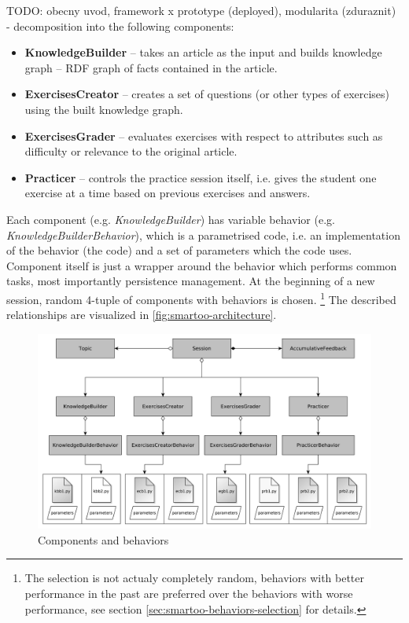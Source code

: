 \documentclass[a4paper, 12pt, twoside]{fithesis2}		%
\renewcommand{\_}{\leavevmode \kern0.07em\vbox{\hrule width0.4em}}
\newcommand{\squarebullet}{\textcolor{black}{\raisebox{0.15em}{\rule{4pt}{4pt}}}}
\newenvironment{myItemize}{
  \begin{itemize}[leftmargin=2em,rightmargin=1em,itemsep=\parskip ,parsep=0em,topsep=0em,partopsep=0em]
  \renewcommand{\labelitemi}{\squarebullet}
  \renewcommand{\labelitemii}{$\diamond$}
}{
  \end{itemize}
}
\begin{document}
TODO: obecny uvod, framework x prototype (deployed), modularita (zduraznit) - decomposition into the following components:
\begin{myItemize}
\item \textbf{KnowledgeBuilder} -- takes an article as the input and builds knowledge graph -- RDF graph of facts contained in the article.
\item \textbf{ExercisesCreator} -- creates a set of questions (or other types of exercises) using the built knowledge graph.
\item \textbf{ExercisesGrader} -- evaluates exercises with respect to attributes such as difficulty or relevance to the original article.
\item \textbf{Practicer} -- controls the practice session itself, i.e. gives the student one exercise at a time based on previous exercises and answers.
\end{myItemize}
Each component (e.g. \textit{KnowledgeBuilder}) has variable behavior (e.g. \textit{KnowledgeBuilderBehavior}), which is a parametrised code, i.e. an implementation of the behavior (the code) and a set of parameters which the code uses.
Component itself is just a wrapper around the behavior which performs common tasks, most importantly persistence management.
At the beginning of a new session, random 4-tuple of components with behaviors is chosen.%
\footnote{The selection is not actualy completely random, behaviors with better performance in the past are preferred over the behaviors with worse performance, see section \autoref{sec:smartoo-behaviors-selection} for details.} The described relationships are visualized in \autoref{fig:smartoo-architecture}.


\begin{figure}[h]
  \centering
  \includegraphics[width=\textwidth]{images/architecture.pdf}
  \caption{Components and behaviors}
  \label{fig:smartoo-architecture}
\end{figure}
\end{document}
